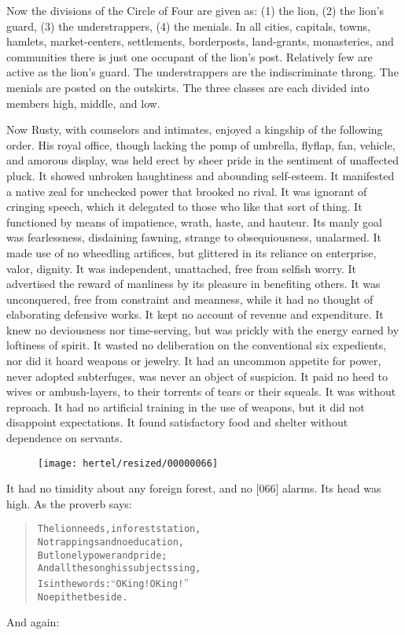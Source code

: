 \documentclass[article, twoside, 10pt]{memoir}
\renewenvironment{verbatim}{%
\begin{quote}%
\vskip -10pt%
\begin{alltt}\normalfont\small}{\end{alltt}%
\end{quote}%
\vskip -10pt
} %
\begin{document}
Now the divisions of the Circle of Four are given as: (1) the lion,
(2) the lion's guard, (3) the understrappers, (4) the menials. In
all cities, capitals, towns, hamlets, market-centers, settlements,
borderposts, land-grants, monasteries, and communities there is
just one occupant of the lion's post. Relatively few are active as
the lion's guard. The understrappers are the indiscriminate throng.
The menials are posted on the outskirts. The three classes are each
divided into members high, middle, and low.

Now Rusty, with counselors and intimates, enjoyed a kingship of the
following order. His royal office, though lacking the pomp of
umbrella, flyflap, fan, vehicle, and amorous display, was held
erect by sheer pride in the sentiment of unaffected pluck. It
showed unbroken haughtiness and abounding self-esteem. It
manifested a native zeal for unchecked power that brooked no rival.
It was ignorant of cringing speech, which it delegated to those who
like that sort of thing. It functioned by means of impatience,
wrath, haste, and hauteur. Its manly goal was fearlessness,
disdaining fawning, strange to obsequiousness, unalarmed. It made
use of no wheedling artifices, but glittered in its reliance on
enterprise, valor, dignity. It was independent, unattached, free
from selfish worry. It advertised the reward of manliness by its
pleasure in benefiting others. It was unconquered, free from
constraint and meanness, while it had no thought of elaborating
defensive works. It kept no account of revenue and expenditure. It
knew no deviousness nor time-serving, but was prickly with the
energy earned by loftiness of spirit. It wasted no deliberation on
the conventional six expedients, nor did it hoard weapons or
jewelry. It had an uncommon appetite for power, never adopted
subterfuges, was never an object of suspicion. It paid no heed to
wives or ambush-layers, to their torrents of tears or their
squeals. It was without reproach. It had no artificial training in
the use of weapons, but it did not disappoint expectations. It
found satisfactory food and shelter without dependence on servants.
\begin{figure}[p]\texttt{[image: hertel/resized/00000066]}\end{figure}It had no timidity about any foreign forest, and no [066] alarms.
Its head was high. As the proverb says:

\begin{verbatim}
The lion needs, in forest station,
No trappings and no education,
    But lonely power and pride;
And all the song his subjects sing,
Is in the words: “O King! O King!”
    No epithet beside.
\end{verbatim}
And again:
\end{document}
